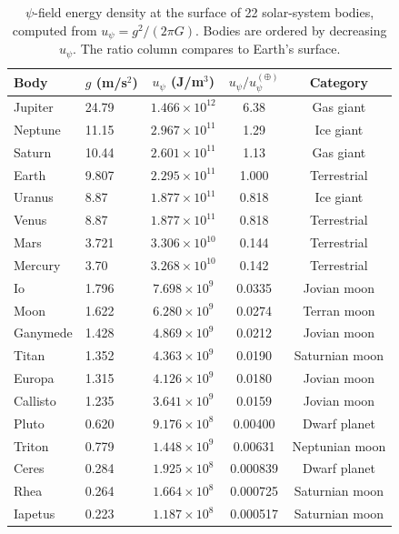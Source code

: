 \documentclass[aps,prd,twocolumn,showpacs,preprintnumbers,superscriptaddress,nofootinbib]{revtex4-2}
\begin{document}
\begin{table}[t]
\caption{$\psi$-field energy density at the surface of 22 solar-system
bodies, computed from $u_\psi = g^2/(2\pi G)$.  Bodies are ordered by
decreasing $u_\psi$.  The ratio column compares to Earth's surface.}
\label{tab:solar-system}
\begin{ruledtabular}
\begin{tabular}{llccc}
Body & $g$ (m/s$^2$) & $u_\psi$ (J/m$^3$) & $u_\psi/u_\psi^{(\oplus)}$ & Category \\
\hline
Jupiter     & 24.79  & $1.466\times 10^{12}$ & 6.38  & Gas giant \\
Neptune     & 11.15  & $2.967\times 10^{11}$ & 1.29  & Ice giant \\
Saturn      & 10.44  & $2.601\times 10^{11}$ & 1.13  & Gas giant \\
Earth       & 9.807  & $2.295\times 10^{11}$ & 1.000 & Terrestrial \\
Uranus      & 8.87   & $1.877\times 10^{11}$ & 0.818 & Ice giant \\
Venus       & 8.87   & $1.877\times 10^{11}$ & 0.818 & Terrestrial \\
Mars        & 3.721  & $3.306\times 10^{10}$ & 0.144 & Terrestrial \\
Mercury     & 3.70   & $3.268\times 10^{10}$ & 0.142 & Terrestrial \\
Io          & 1.796  & $7.698\times 10^{9}$  & 0.0335 & Jovian moon \\
Moon        & 1.622  & $6.280\times 10^{9}$  & 0.0274 & Terran moon \\
Ganymede    & 1.428  & $4.869\times 10^{9}$  & 0.0212 & Jovian moon \\
Titan       & 1.352  & $4.363\times 10^{9}$  & 0.0190 & Saturnian moon \\
Europa      & 1.315  & $4.126\times 10^{9}$  & 0.0180 & Jovian moon \\
Callisto    & 1.235  & $3.641\times 10^{9}$  & 0.0159 & Jovian moon \\
Pluto       & 0.620  & $9.176\times 10^{8}$  & 0.00400 & Dwarf planet \\
Triton      & 0.779  & $1.448\times 10^{9}$  & 0.00631 & Neptunian moon \\
Ceres       & 0.284  & $1.925\times 10^{8}$  & 0.000839 & Dwarf planet \\
Rhea        & 0.264  & $1.664\times 10^{8}$  & 0.000725 & Saturnian moon \\
Iapetus     & 0.223  & $1.187\times 10^{8}$  & 0.000517 & Saturnian moon \\

\end{tabular}
\end{ruledtabular}
\end{table}
\end{document}
